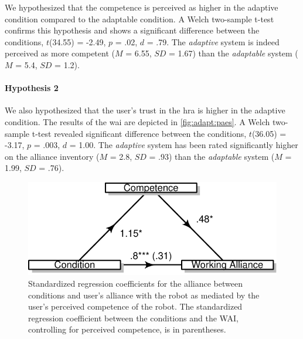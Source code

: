 \documentclass[twocolumn]{svjour3}          %
\begin{document}
We hypothesized that the competence is perceived as higher in the adaptive condition compared to the adaptable condition. A Welch two-sample t-test confirms this hypothesis and shows a significant difference between the conditions,
\(t\)(34.55) = -2.49, \(p\) = .02, \(d\) = .79. The \textit{adaptive} system is indeed
perceived as more competent (\(M\) = 6.55, \(SD\) = 1.67) than the
\textit{adaptable} system (\(M\) = 5.4, \(SD\) = 1.2).
% 
% 


\hypertarget{working-alliance}{%
\paragraph{Hypothesis 2}\label{working-alliance}}
We also hypothesized that the user's trust in the \gls{hra} is higher in the adaptive condition. The results of the \gls{wai} are depicted in \autoref{fig:adapt:paes}. A Welch
two-sample t-test revealed significant difference between the
conditions, \(t\)(36.05) = -3.17, \(p\) = .003, \(d\) = 1.00. The
\textit{adaptive} system has been rated significantly higher on the alliance
inventory (\(M\) = 2.8, \(SD\) = .93) than the \textit{adaptable} system (\(M\) =
1.99, \(SD\) = .76).

\begin{figure}[h!]
\includegraphics[width=\columnwidth]{figures/figure-latex/unnamed-chunk-9-1} \caption{\label{fig:adapt:mediation}Standardized regression coefficients for the alliance between conditions and user's alliance with the robot as mediated by the user's perceived competence of the robot. The standardized regression coefficient between the conditions and the WAI, controlling for perceived competence, is in parentheses.}\label{fig:unnamed-chunk-9}
\end{figure}
\end{document}
